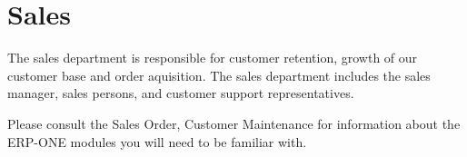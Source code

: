 \section{Sales}

The sales department is responsible for customer retention, growth of our customer base and order aquisition.  The sales department includes the sales manager, sales persons, and customer support representatives.

Please consult the Sales Order, Customer Maintenance for information about the ERP-ONE modules you will need to be familiar with.
